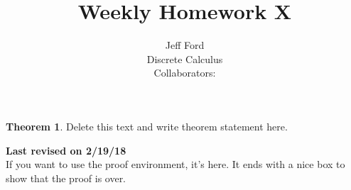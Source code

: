 \documentclass[12 pt]{article}
\theoremstyle{definition}
\newtheorem*{thm}{Theorem}
\newcommand\rev[1]{\noindent\textbf{Last revised on {#1}}\\}
\begin{document}
 
 
\title{Weekly Homework X}%
\author{Jeff Ford\\ %
Discrete Calculus\\
Collaborators: } %
 
\maketitle
 
\begin{thm} 
Delete this text and write theorem statement here.
\end{thm}
\rev{2/19/18} %
If you want to use the proof environment, it's here. It ends with a nice box to show that the proof is over.
\end{document}

